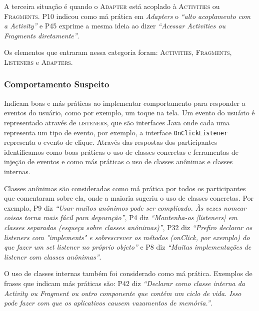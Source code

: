 A terceira situação é quando o \textsc{Adapter} está acoplado à \textsc{Activities} ou \textsc{Fragments}. P10 indicou como má prática em \textit{Adapters} o \textit{``alto acoplamento com a Activity''} e P45 exprime a mesma ideia ao dizer \textit{``Acessar Activities ou Fragments diretamente''}. 

Os elementos que entraram nessa categoria foram: \textsc{Activities}, \textsc{Fragments}, \textsc{Listeners} e \textsc{Adapters}. 

\subsubsection{Comportamento Suspeito}
Indicam boas e más práticas ao implementar comportamento para responder a eventos do usuário, como por exemplo, um toque na tela. Um evento do usuário é representado através de \textsc{listeners}, que são interfaces Java onde cada uma representa um tipo de evento, por exemplo, a interface \texttt{OnClickListener} representa o evento de clique. Através das respostas dos participantes identificamos como boas práticas o uso de classes concretas e ferramentas de injeção de eventos e como más práticas o uso de classes an\^onimas e classes internas.

Classes an\^onimas são consideradas como má prática por todos os participantes que comentaram sobre ela, onde a maioria sugeriu o uso de classes concretas. Por exemplo, P9 diz \textit{``Usar muitos an\^onimos pode ser complicado. Às vezes nomear coisas torna mais fácil para depuração''}, P4 diz \textit{``Mantenha-os [listeners] em classes separadas (esqueça sobre classes an\^onimas)''}, P32 diz \textit{``Prefiro declarar os listeners com "implements" e sobrescrever os métodos (onClick, por exemplo) do que fazer um set listener no próprio objeto''} e P8 diz \textit{``Muitas implementações de listener com classes an\^onimas''}.

O uso de classes internas também foi considerado como má prática. Exemplos de frases que indicam más práticas são: P42 diz \textit{``Declarar como classe interna da Activity ou Fragment ou outro componente que contém um ciclo de vida. Isso pode fazer com que os aplicativos causem vazamentos de memória.''}.

